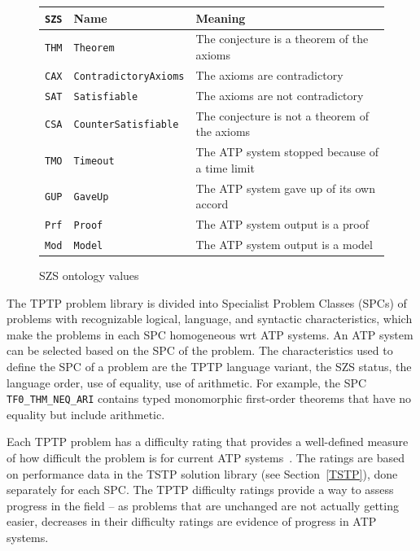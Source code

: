 \documentclass[runningheads]{llncs}
\begin{document}

\begin{figure}[htb]
\centering
\begin{tabular}{lll}
{\tt SZS} & Name                      & Meaning \\
\hline
{\tt THM} & {\tt Theorem}             & The conjecture is a theorem of the axioms \\
{\tt CAX} & {\tt ContradictoryAxioms} & The axioms are contradictory \\
{\tt SAT} & {\tt Satisfiable}         & The axioms are not contradictory \\
{\tt CSA} & {\tt CounterSatisfiable}  & The conjecture is not a theorem of the axioms \\
{\tt TMO} & {\tt Timeout}             & The ATP system stopped because of a time limit \\
{\tt GUP} & {\tt GaveUp}              & The ATP system gave up of its own accord \\
{\tt Prf} & {\tt Proof}               & The ATP system output is a proof \\
{\tt Mod} & {\tt Model}               & The ATP system output is a model \\
\end{tabular}
\caption{SZS ontology values}
\label{SZSTable}
\end{figure} 

The TPTP problem library is divided into Specialist Problem Classes (SPCs) of problems with 
recognizable logical, language, and syntactic characteristics, which make the problems in each 
SPC homogeneous wrt ATP systems.
An ATP system can be selected based on the SPC of the problem.
The characteristics used to define the SPC of a problem are the TPTP language variant, the SZS
status, the language order, use of equality, use of arithmetic.
For example, the SPC {\tt TF0\_THM\_NEQ\_ARI} contains typed monomorphic first-order theorems 
that have no equality but include arithmetic.

Each TPTP problem has a difficulty rating that provides a well-defined measure of how difficult 
the problem is for current ATP systems~\cite{SS01}.
The ratings are based on performance data in the TSTP solution library (see Section~\ref{TSTP}), 
done separately for each SPC.
The TPTP difficulty ratings provide a way to assess progress in the field -- as problems that 
are unchanged are not actually getting easier, decreases in their difficulty ratings are evidence 
of progress in ATP systems.
\end{document}
